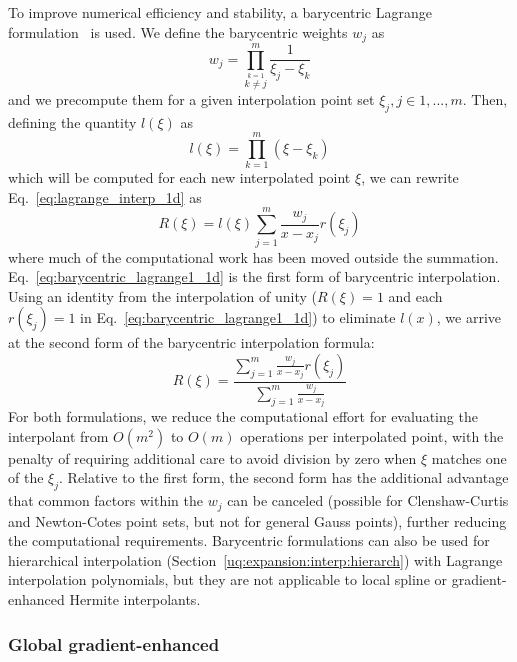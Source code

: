 To improve numerical efficiency and stability, a barycentric Lagrange
formulation~\cite{BerTref04,Higham04} is used.  We define
the barycentric weights $w_j$ as
\begin{equation}
w_j = \prod_{\stackrel{\scriptstyle k=1}{k \ne j}}^m 
\frac{1}{\xi_j - \xi_k} \label{eq:barycentric_weights}
\end{equation}
and we precompute them for a given interpolation point set 
$\xi_j, j \in 1, ..., m$.  Then, defining the quantity $l(\xi)$ as
\begin{equation}
l(\xi) = \prod_{k=1}^m (\xi - \xi_k) \label{eq:barycentric_prod}
\end{equation}
which will be computed for each new interpolated point $\xi$, we can 
rewrite Eq.~\ref{eq:lagrange_interp_1d} as
\begin{equation}
R(\xi) = l(\xi) \sum_{j=1}^m \frac{w_j}{x-x_j} r(\xi_j) 
\label{eq:barycentric_lagrange1_1d}
\end{equation}
where much of the computational work has been moved outside the
summation.  Eq.~\ref{eq:barycentric_lagrange1_1d} is the first form of
barycentric interpolation.  Using an identity from the interpolation
of unity ($R(\xi) = 1$ and each $r(\xi_j) = 1$ in
Eq.~\ref{eq:barycentric_lagrange1_1d}) to eliminate $l(x)$, we arrive
at the second form of the barycentric interpolation formula:
\begin{equation}
R(\xi) = 
\frac{\sum_{j=1}^m \frac{w_j}{x-x_j} r(\xi_j)}{\sum_{j=1}^m \frac{w_j}{x-x_j}}
\label{eq:barycentric_lagrange2_1d}
\end{equation}
For both formulations, we reduce the computational effort for
evaluating the interpolant from $O(m^2)$ to $O(m)$ operations per
interpolated point, with the penalty of requiring additional care to
avoid division by zero when $\xi$ matches one of the $\xi_j$.
Relative to the first form, the second form has the additional
advantage that common factors within the $w_j$ can be canceled
(possible for Clenshaw-Curtis and Newton-Cotes point sets, but not for
general Gauss points), further reducing the computational requirements.
Barycentric formulations can also be used for hierarchical
interpolation (Section~\ref{uq:expansion:interp:hierarch}) with
Lagrange interpolation polynomials, but they are not applicable to
local spline or gradient-enhanced Hermite interpolants.


\subsubsection{Global gradient-enhanced} \label{uq:expansion:interp:Hermite}


